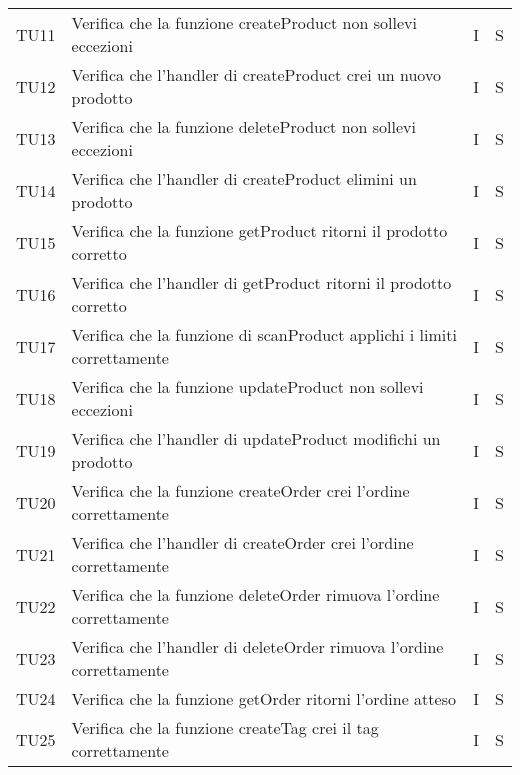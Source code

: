 \begin{center}
\begin{longtable}[!h]{p{45px} p{255px} p{35px} p{35px}}
        TU11          & Verifica che la funzione createProduct non sollevi eccezioni                     & I              & S              \\
        TU12          & Verifica che l'handler di createProduct crei un nuovo prodotto                   & I              & S              \\
        TU13          & Verifica che la funzione deleteProduct non sollevi eccezioni                     & I              & S              \\
        TU14          & Verifica che l'handler di createProduct elimini un prodotto                      & I              & S              \\
        TU15          & Verifica che la funzione getProduct ritorni il prodotto corretto                 & I              & S              \\
        TU16          & Verifica che l'handler di getProduct ritorni il prodotto corretto                & I              & S              \\
        TU17          & Verifica che la funzione di scanProduct applichi i limiti correttamente          & I              & S              \\
        TU18          & Verifica che la funzione updateProduct non sollevi eccezioni                     & I              & S              \\
        TU19          & Verifica che l'handler di updateProduct modifichi un prodotto                    & I              & S              \\
        TU20          & Verifica che la funzione createOrder crei l'ordine correttamente                 & I              & S              \\
        TU21          & Verifica che l'handler di createOrder crei l'ordine correttamente                & I              & S              \\
        TU22          & Verifica che la funzione deleteOrder rimuova l'ordine correttamente              & I              & S              \\
        TU23          & Verifica che l'handler di deleteOrder rimuova l'ordine correttamente             & I              & S              \\
        TU24          & Verifica che la funzione getOrder ritorni l'ordine atteso                        & I              & S              \\
        TU25          & Verifica che la funzione createTag crei il tag correttamente                     & I              & S              \\

\end{longtable}
\end{center}
